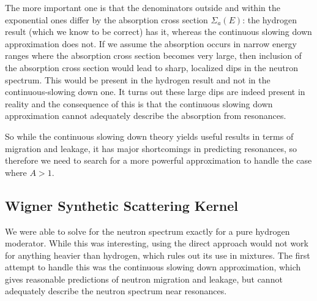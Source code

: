 The more important one is that the denominators outside and within the exponential ones differ by the absorption cross section $\Sigma_a(E)$: the hydrogen result (which we know to be correct) has it, whereas the continuous slowing down approximation does not. If we assume the absorption occurs in narrow energy ranges where the absorption cross section becomes very large, then inclusion of the absorption cross section would lead to sharp, localized dips in the neutron spectrum. This would be present in the hydrogen result and not in the continuous-slowing down one. It turns out these large dips are indeed present in reality and the consequence of this is that the continuous slowing down approximation cannot adequately describe the absorption from resonances.

So while the continuous slowing down theory yields useful results in terms of migration and leakage, it has major shortcomings in predicting resonances, so therefore we need to search for a more powerful approximation to handle the case where $A > 1$.

\subsection{Wigner Synthetic Scattering Kernel}

We were able to solve for the neutron spectrum exactly for a pure hydrogen moderator. While this was interesting, using the direct approach would not work for anything heavier than hydrogen, which rules out its use in mixtures. The first attempt to handle this was the continuous slowing down approximation, which gives reasonable predictions of neutron migration and leakage, but cannot adequately describe the neutron spectrum near resonances. 

